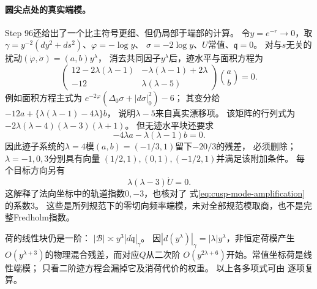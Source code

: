 \documentclass[UTF8,a4paper,11pt,fontset=fandol]{ctexart}
\numberwithin{equation}{section}
\theoremstyle{definition}
\begin{document}
\paragraph{圆尖点处的真实端模。}
Step 96还给出了一个比主符号更细、但仍局部于端部的计算。
令$y=e^{-r}\to0$，取
$\gamma=y^{-2}(dy^2+ds^2)$、$\varphi=-\log y$、
$\sigma=-2\log y$、$U$常值、$\mathfrak q=0$。
对与$s$无关的扰动$(\dot\varphi,\dot\sigma)=(a,b)y^\lambda$，
消去共同因子$y^\lambda$后，迹水平与面积方程为
\begin{equation}\label{eq:cusp-scalar-indicial}
 \begin{pmatrix}
 12-2\lambda(\lambda-1)&-\lambda(\lambda-1)+2\lambda\\
 -12&\lambda(\lambda-5)
 \end{pmatrix}\binom ab=0.
\end{equation}
例如面积方程主式为
$e^{-2\varphi}(\Delta_0\sigma+|d\sigma|_0^2)-6$；
其变分给$-12a+\{\lambda(\lambda-1)-4\lambda\}b$，
说明$\lambda-5$来自真实漂移项。
该矩阵的行列式为$-2\lambda(\lambda-4)(\lambda-3)(\lambda+1)$。
但无迹水平块还要求
\[
 -4\lambda a-\lambda(\lambda-1)b=0.
\]
因此迹子系统的$\lambda=4$模$(a,b)=(-1/3,1)$留下$-20/3$的残差，
必须删除；$\lambda=-1,0,3$分别具有向量
$(1/2,1),(0,1),(-1/2,1)$并满足该附加条件。
每个目标方向另有
\begin{equation}\label{eq:cusp-orbit-indicial}
 \lambda(\lambda-3)\dot U=0.
\end{equation}
这解释了法向坐标中的轨道指数$0,-3$，也核对了
式\eqref{eq:cusp-mode-amplification}的系数$3$。
这些是所列规范下的零切向频率端模，未对全部规范模取商，也不是完整Fredholm指数。

荷的线性块仍是一阶：
$|\mathscr B|\asymp y^3|d\dot{\mathfrak q}|_\gamma$。
因$|d(y^\lambda)|_\gamma=|\lambda|y^\lambda$，非恒定荷模产生
$O(y^{\lambda+3})$的物理混合残差，而对应$Q$从二次阶
$O(y^{2\lambda+6})$开始。常值坐标荷是线性端模；
只看二阶迹方程会漏掉它及消荷代价的权重。
以上各多项式可由
逐项复算。
\end{document}
